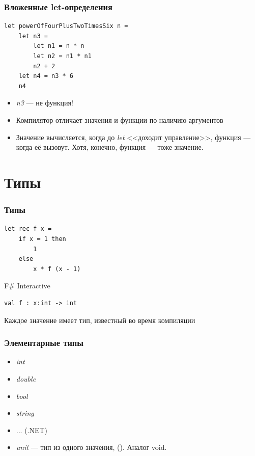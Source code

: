\documentclass{../../slides-style}
\begin{document}
    \begin{frame}[fragile]
        \frametitle{Вложенные let-определения}
        \begin{verbatim}
let powerOfFourPlusTwoTimesSix n =
    let n3 =
        let n1 = n * n
        let n2 = n1 * n1
        n2 + 2
    let n4 = n3 * 6
    n4
        \end{verbatim}
        \begin{itemize}
            \item \textit{n3} --- не функция!
            \item Компилятор отличает значения и функции по наличию аргументов
            \item Значение вычисляется, когда до \textit{let} <<доходит управление>>, 
                    функция --- когда её вызовут. Хотя, конечно, функция --- тоже значение.
        \end{itemize}
    \end{frame}

    \section{Типы}

    \begin{frame}[fragile]
        \frametitle{Типы}
        \begin{verbatim}
let rec f x =
    if x = 1 then 
        1 
    else 
        x * f (x - 1)
        \end{verbatim}

        \begin{alertblock}{F\# Interactive}
            \begin{verbatim}
val f : x:int -> int
            \end{verbatim}
        \end{alertblock}
        Каждое значение имеет тип, известный во время компиляции
    \end{frame}

    \begin{frame}
        \frametitle{Элементарные типы}
        \begin{itemize}
            \item \textit{int}
            \item \textit{double}
            \item \textit{bool}
            \item \textit{string}
            \item ... (.NET)
            \item \textit{unit} --- тип из одного значения, (). Аналог void.
        \end{itemize}
    \end{frame}
    
\end{document}

